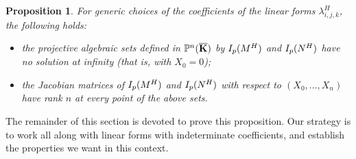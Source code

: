 \documentclass[12pt]{article}
\newtheorem{proposition}[definition]{Proposition}
\begin{document}
\begin{proposition}\label{lemma:appendix}
  For generic choices of the coefficients of the linear forms
  $\lambda^H_{i,j,k}$, the following holds:
  \begin{itemize}
  \item the projective algebraic sets defined in $\mathbb{P}^n(\overline{\mathbf{K}})$ by
    $I_p({M}^H)$ and $I_p({N}^H)$ have no solution at infinity (that
    is, with $X_0=0$);
  \item the Jacobian matrices of $I_p({M}^H)$ and $I_p({N}^H)$ with
    respect to $(X_0,\dots,X_n)$ have rank $n$ at every point of the
    above sets.
\end{itemize}
\end{proposition}


The remainder of this section is devoted to prove this proposition.
Our strategy is to work all along with linear forms with indeterminate
coefficients, and establish the properties we want in this context.


\end{document}
